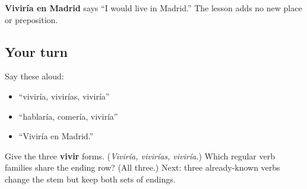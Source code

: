 \begin{grammarlens}[title={Grammar Lens: meaning with known words}]
\textbf{Viviría en Madrid} says “I would live in Madrid.” The lesson adds no new place or preposition.
\end{grammarlens}

\subsection*{Your turn}
Say these aloud:

\begin{itemize}
\raggedright
  \item “viviría, vivirías, viviría”
  \item “hablaría, comería, viviría”
  \item “Viviría en Madrid.”
\end{itemize}

\begin{tcolorbox}[breakable,colback=teal!4,colframe=teal!35!black,title={Before you move on}]
Give the three \textbf{vivir} forms. (\emph{Viviría, vivirías, viviría.}) Which regular verb families share the ending row? (All three.) Next: three already-known verbs change the stem but keep both sets of endings.
\end{tcolorbox}
